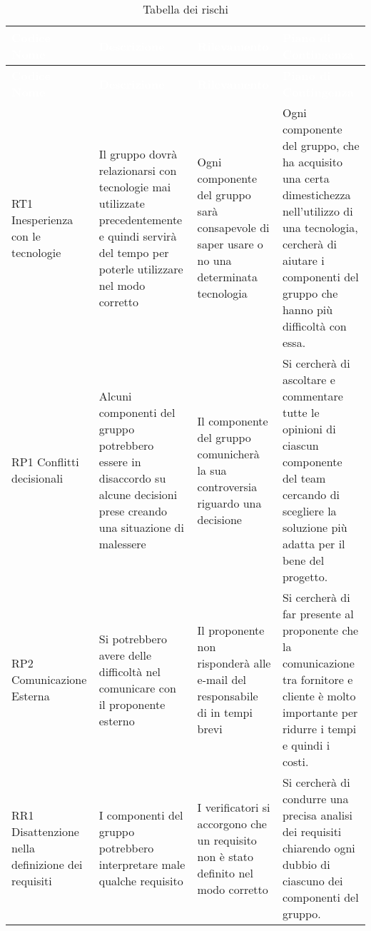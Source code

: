 {
\renewcommand{\arraystretch}{2}
\centering
\begin{longtable}{ C{2cm} C{4cm} C{4cm} C{4.9cm}}
\caption{Tabella dei rischi}\\
	\textcolor{white}{\textbf{Codice Nome}} & 
	\textcolor{white}{\textbf{Descrizione}} & 
	\textcolor{white}{\textbf{Rilevamento}} &  
	\textcolor{white}{\textbf{Piano di Contingenza}}\\	
\endfirsthead

	\textcolor{white}{\textbf{Codice Nome}} & 
	\textcolor{white}{\textbf{Descrizione}} & 
	\textcolor{white}{\textbf{Rilevamento}} &  
	\textcolor{white}{\textbf{Piano di Contingenza}}\\	
\endhead


RT1 Inesperienza con le tecnologie & Il gruppo dovrà relazionarsi con tecnologie mai utilizzate precedentemente e quindi servirà del tempo per poterle utilizzare nel modo corretto & Ogni componente del gruppo sarà consapevole di saper usare o no una determinata tecnologia & Ogni componente del gruppo, che ha acquisito una certa dimestichezza nell'utilizzo di una tecnologia, cercherà di aiutare i componenti del gruppo che hanno più difficoltà con essa. \\

RP1 Conflitti decisionali & Alcuni componenti del gruppo potrebbero essere in disaccordo su alcune decisioni prese creando una situazione di malessere & Il componente del gruppo comunicherà la sua controversia riguardo una decisione  & Si cercherà di ascoltare e commentare tutte le opinioni di ciascun componente del team cercando di scegliere la soluzione più adatta per il bene del progetto. \\ 

RP2 Comunicazione Esterna & Si potrebbero avere delle difficoltà nel comunicare con il proponente esterno & Il proponente non risponderà alle e-mail del responsabile di \Gruppo{} in tempi brevi & Si cercherà di far presente al proponente \ZD{} che la comunicazione tra fornitore e cliente è molto importante per ridurre i tempi e quindi i costi. \\

RR1 Disattenzione nella definizione dei requisiti & I componenti del gruppo potrebbero interpretare male qualche requisito & I verificatori si accorgono che un requisito non è stato definito nel modo corretto & Si cercherà di condurre una precisa analisi dei requisiti chiarendo ogni dubbio di ciascuno dei componenti del gruppo. \\


\end{longtable}}
